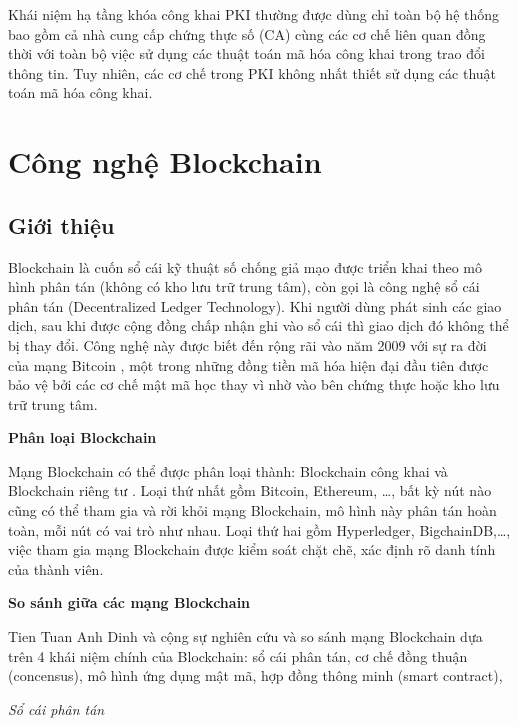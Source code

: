 Khái niệm hạ tầng khóa công khai PKI thường được dùng chỉ toàn bộ hệ thống bao gồm cả nhà cung cấp chứng thực số (CA) cùng các cơ chế liên quan đồng thời với toàn bộ việc sử dụng các thuật toán mã hóa công khai trong trao đổi thông tin. Tuy nhiên, các cơ chế trong PKI không nhất thiết sử dụng các thuật toán mã hóa công khai.

\section{Công nghệ Blockchain}
\subsection{Giới thiệu}
Blockchain là cuốn sổ cái kỹ thuật số chống giả mạo được triển khai theo mô hình phân tán (không có kho lưu trữ trung tâm), còn gọi là công nghệ sổ cái phân tán (Decentralized Ledger Technology).
Khi người dùng phát sinh các giao dịch, sau khi được cộng đồng chấp nhận ghi vào sổ cái thì giao dịch đó không thể bị thay đổi.
Công nghệ này được biết đến rộng rãi vào năm 2009 với sự ra đời của mạng Bitcoin \cite{nakamoto2008bitcoin}, một trong những đồng tiền mã hóa hiện đại đầu tiên được bảo vệ bởi các cơ chế mật mã học thay vì nhờ vào bên chứng thực hoặc kho lưu trữ trung tâm.

\textbf{Phân loại Blockchain}

Mạng Blockchain có thể được phân loại thành: Blockchain công khai và Blockchain riêng tư \cite{8246573}. 
Loại thứ nhất gồm Bitcoin, Ethereum, \ldots, bất kỳ nút nào cũng có thể tham gia và rời khỏi mạng Blockchain, mô hình này phân tán hoàn toàn, mỗi nút có vai trò như nhau.
Loại thứ hai gồm Hyperledger, BigchainDB,\ldots, việc tham gia mạng Blockchain được kiểm soát chặt chẽ, xác định rõ danh tính của thành viên.

\textbf{So sánh giữa các mạng Blockchain}

Tien Tuan Anh Dinh và cộng sự  \cite{8246573} nghiên cứu và so sánh mạng Blockchain dựa trên 4 khái niệm chính của Blockchain: sổ cái phân tán, cơ chế đồng thuận (concensus), mô hình ứng dụng mật mã, hợp đồng thông minh (smart contract),

\emph{Sổ cái phân tán}


